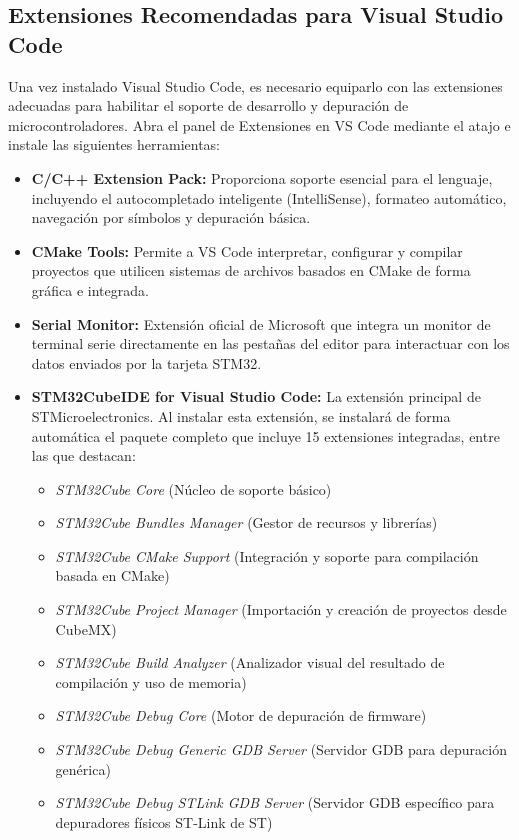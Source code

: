 \documentclass[
10pt, %
a4paper, %
oneside, %
headinclude,footinclude, %
BCOR5mm, %
]{scrartcl}
\begin{document}
\subsection{Extensiones Recomendadas para Visual Studio Code}
Una vez instalado Visual Studio Code, es necesario equiparlo con las extensiones adecuadas para habilitar el soporte de desarrollo y depuración de microcontroladores. Abra el panel de Extensiones en VS Code mediante el atajo  e instale las siguientes herramientas:
\begin{itemize}
	\item \textbf{C/C++ Extension Pack:} Proporciona soporte esencial para el lenguaje, incluyendo el autocompletado inteligente (IntelliSense), formateo automático, navegación por símbolos y depuración básica.
	\item \textbf{CMake Tools:} Permite a VS Code interpretar, configurar y compilar proyectos que utilicen sistemas de archivos basados en CMake de forma gráfica e integrada.
	\item \textbf{Serial Monitor:} Extensión oficial de Microsoft que integra un monitor de terminal serie directamente en las pestañas del editor para interactuar con los datos enviados por la tarjeta STM32.
	\item \textbf{STM32CubeIDE for Visual Studio Code:} La extensión principal de STMicroelectronics. Al instalar esta extensión, se instalará de forma automática el paquete completo que incluye 15 extensiones integradas, entre las que destacan:
	\begin{itemize}
		\item \textit{STM32Cube Core} (Núcleo de soporte básico)
		\item \textit{STM32Cube Bundles Manager} (Gestor de recursos y librerías)
		\item \textit{STM32Cube CMake Support} (Integración y soporte para compilación basada en CMake)
		\item \textit{STM32Cube Project Manager} (Importación y creación de proyectos desde CubeMX)
		\item \textit{STM32Cube Build Analyzer} (Analizador visual del resultado de compilación y uso de memoria)
		\item \textit{STM32Cube Debug Core} (Motor de depuración de firmware)
		\item \textit{STM32Cube Debug Generic GDB Server} (Servidor GDB para depuración genérica)
		\item \textit{STM32Cube Debug STLink GDB Server} (Servidor GDB específico para depuradores físicos ST-Link de ST)

\end{itemize}
\end{itemize}
\end{document}
